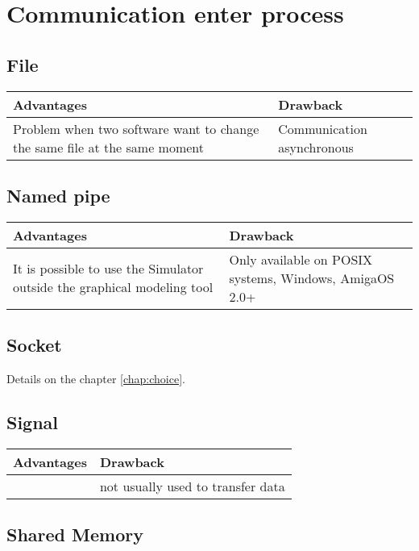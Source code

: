 
\chapter{Communication enter process}
\label{annex:choice}


\section{File}

\begin{tabular}{|p{}||p{}|}
\hline
  \textbf{Advantages}&\textbf{Drawback}\\
\hline
Problem when two software want to change the same file at the same moment& Communication asynchronous\\
\hline
\end{tabular}

\section{Named pipe}

\begin{tabular}{|p{}||p{}|}
\hline
  \textbf{Advantages}&\textbf{Drawback}\\
\hline
It is possible to use the Simulator outside the graphical modeling tool & Only available on POSIX systems, Windows, AmigaOS 2.0+\\
\hline
\end{tabular}

\section{Socket}

Details on the chapter \ref{chap:choice}.

\section{Signal}

\begin{tabular}{|p{}||p{}|}
\hline
  \textbf{Advantages}&\textbf{Drawback}\\
\hline
 & not usually used to transfer data\\
\hline
\end{tabular}


\section{Shared Memory}

